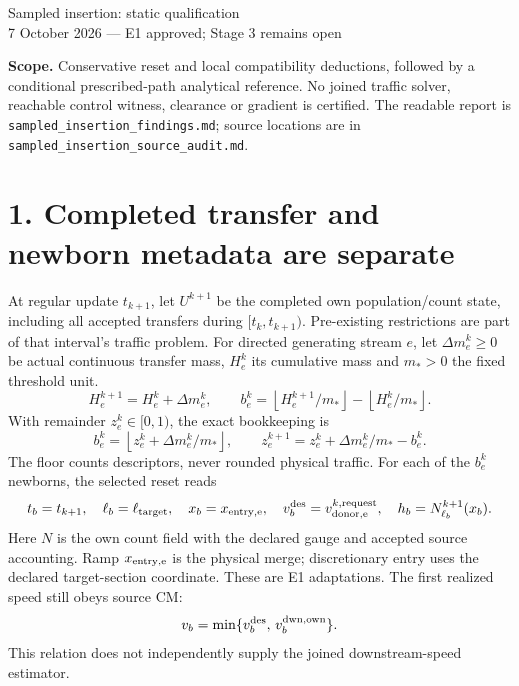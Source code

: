 \documentclass[11pt,a4paper]{article}
\begin{document}
{\Large Sampled insertion: static qualification}\\[4pt]
7 October 2026 --- E1 approved; Stage 3 remains open

\textbf{Scope.} Conservative reset and local compatibility deductions, followed
by a conditional prescribed-path analytical reference. No joined traffic solver,
reachable control witness, clearance or gradient is certified. The readable
report is \texttt{sampled\_insertion\_findings.md}; source locations are in
\texttt{sampled\_insertion\_source\_audit.md}.

\section*{1. Completed transfer and newborn metadata are separate}
At regular update $t_{k+1}$, let $U^{k+1}$ be the completed own population/count
state, including all accepted transfers during $[t_k,t_{k+1})$.
Pre-existing restrictions are part of that interval's traffic problem.
For directed generating stream $e$, let $\Delta m_e^k\ge0$ be actual continuous
transfer mass, $H_e^k$ its cumulative mass and $m_*>0$ the fixed threshold unit.
\begin{equation}
 H_e^{k+1}=H_e^k+\Delta m_e^k,\qquad
 b_e^k=\left\lfloor H_e^{k+1}/m_*\right\rfloor
       -\left\lfloor H_e^k/m_*\right\rfloor .
\end{equation}
With remainder $z_e^k\in[0,1)$, the exact bookkeeping is
\begin{equation}
 b_e^k=\left\lfloor z_e^k+\Delta m_e^k/m_*\right\rfloor,\qquad
 z_e^{k+1}=z_e^k+\Delta m_e^k/m_*-b_e^k .
\end{equation}
The floor counts descriptors, never rounded physical traffic.
For each of the $b_e^k$ newborns, the selected reset reads
\begin{equation}
 t_b=t_{k+1},\quad \ell_b=\ell_{\rm target},\quad
 x_b=x_{\rm entry,e},\quad v_b^{\rm des}=v_{\rm donor,e}^{k,\rm request},
 \quad h_b=N_{\ell_b}^{k+1}(x_b).
\end{equation}
Here $N$ is the own count field with the declared gauge and accepted source
accounting. Ramp $x_{\rm entry,e}$ is the physical merge; discretionary entry
uses the declared target-section coordinate. These are E1 adaptations.
The first realized speed still obeys source CM:
\begin{equation}
 v_b=\min\{v_b^{\rm des},\,v_b^{\rm dwn,own}\}.
\end{equation}
This relation does not independently supply the joined downstream-speed estimator.
\end{document}
